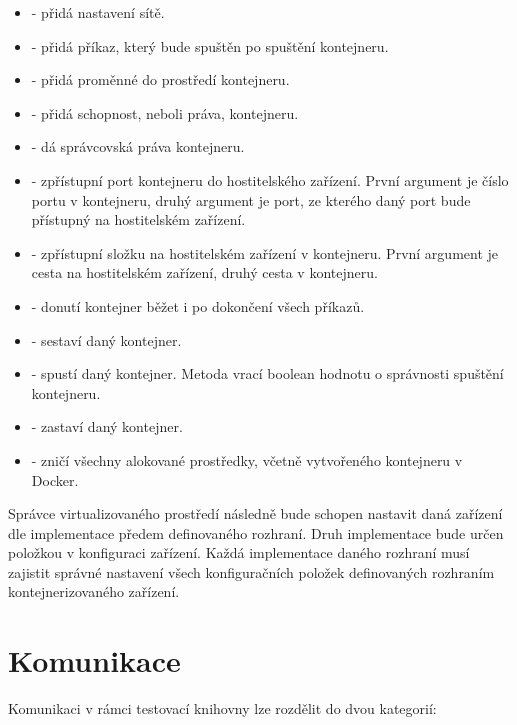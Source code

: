 \begin{itemize}
    \item {} - přidá nastavení sítě.
    \item {} - přidá příkaz, který bude spuštěn po spuštění kontejneru.
    \item {} - přidá proměnné do prostředí kontejneru.
    \item {} - přidá schopnost, neboli práva, kontejneru.
    \item {} - dá správcovská práva kontejneru.
    \item {} - zpřístupní port kontejneru do hostitelského zařízení. První argument je číslo portu v kontejneru, druhý argument je port, ze kterého daný port bude přístupný na hostitelském zařízení. 
    \item {} - zpřístupní složku na hostitelském zařízení v kontejneru. První argument je cesta na hostitelském zařízení, druhý cesta v kontejneru.
    \item {} - donutí kontejner běžet i po dokončení všech příkazů.
    \item {} - sestaví daný kontejner.
    \item {} - spustí daný kontejner. Metoda vrací boolean hodnotu o správnosti spuštění kontejneru.
    \item {} - zastaví daný kontejner.
    \item {} - zničí všechny alokované prostředky, včetně vytvořeného kontejneru v Docker.
\end{itemize}

Správce virtualizovaného prostředí následně bude schopen nastavit daná zařízení dle implementace předem definovaného rozhraní. Druh implementace bude určen položkou  v konfiguraci zařízení. Každá implementace daného rozhraní musí zajistit správné nastavení všech konfiguračních položek definovaných rozhraním kontejnerizovaného zařízení.

\section{Komunikace}

Komunikaci v rámci testovací knihovny lze rozdělit do dvou kategorií:

